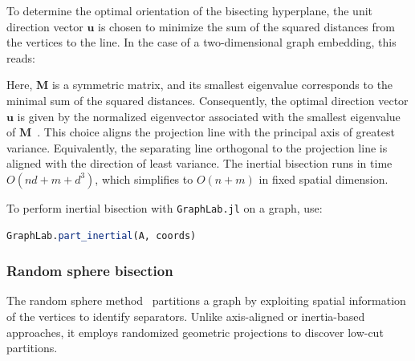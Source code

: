     
    
    
    
    To determine the optimal orientation of the bisecting hyperplane, the unit direction vector $\mathbf{u}$ is chosen to minimize the sum of the squared
    distances from the vertices to the line. In the case of a two-dimensional graph embedding, this reads:
    
    
    
    Here, $\mathbf{M}$ is a symmetric matrix, and its smallest eigenvalue corresponds to the minimal sum of the squared distances. Consequently, the optimal direction vector $\mathbf{u}$ is given by the
    normalized eigenvector associated with the smallest eigenvalue of
    $\mathbf{M}$~\cite{elsner1997graph}.
    This choice aligns the projection line with the principal axis of greatest variance. Equivalently, the separating line orthogonal to the projection line is aligned with the direction of least variance.
    The inertial bisection runs in time $O(nd+m+d^3)$, which simplifies to $O(n+m)$ in fixed spatial dimension.
    
    

    To perform inertial bisection with \texttt{GraphLab.jl} on a graph, use:

    \begin{lstlisting}[language=Julia]
    GraphLab.part_inertial(A, coords)
    \end{lstlisting}

    \subsubsection{Random sphere bisection}
    \label{sub:rand_sphere}

    The random sphere method~\cite{doi:10.1137/S1064827594275339} partitions a graph
    by exploiting spatial information of the vertices to identify separators.
    Unlike axis-aligned or inertia-based approaches,
    it employs randomized geometric projections to discover low-cut partitions.
    
